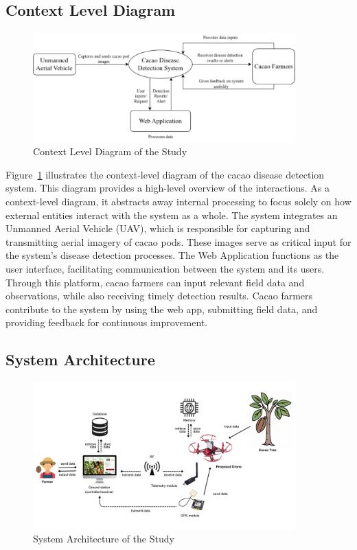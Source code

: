 \subsection{Context Level Diagram}

\begin{figure}[H]
	\centering
	\caption{Context Level Diagram of the Study}
	\label{fig:contex-level}
	\includegraphics[width=0.9\textwidth]{figures/Context_Level.pdf}
\end{figure}

Figure~\ref{fig:contex-level} illustrates the context-level diagram of the cacao disease detection system. This diagram provides a high-level overview of the interactions. As a context-level diagram, it abstracts away internal processing to focus solely on how external entities interact with the system as a whole. The system integrates an Unmanned Aerial Vehicle (UAV), which is responsible for capturing and transmitting aerial imagery of cacao pods. These images serve as critical input for the system’s disease detection processes. The Web Application functions as the user interface, facilitating communication between the system and its users. Through this platform, cacao farmers can input relevant field data and observations, while also receiving timely detection results. Cacao farmers contribute to the system by using the web app, submitting field data, and providing feedback for continuous improvement.

\subsection{System Architecture}

\begin{figure}[H]
	\centering
	\caption{System Architecture of the Study}
	\label{fig:SysArch}
	\includegraphics[width=0.9\textwidth]{figures/Sys_Arch.pdf}
\end{figure}

